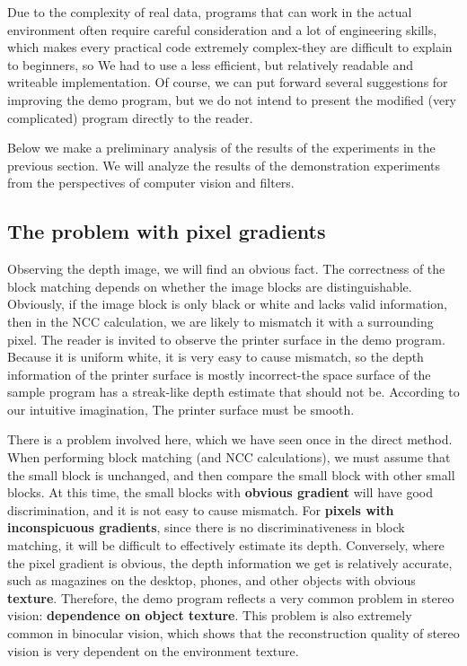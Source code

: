 Due to the complexity of real data, programs that can work in the actual environment often require careful consideration and a lot of engineering skills, which makes every practical code extremely complex-they are difficult to explain to beginners, so We had to use a less efficient, but relatively readable and writeable implementation. Of course, we can put forward several suggestions for improving the demo program, but we do not intend to present the modified (very complicated) program directly to the reader.

Below we make a preliminary analysis of the results of the experiments in the previous section. We will analyze the results of the demonstration experiments from the perspectives of computer vision and filters.

\subsection{The problem with pixel gradients}
Observing the depth image, we will find an obvious fact. The correctness of the block matching depends on whether the image blocks are distinguishable. Obviously, if the image block is only black or white and lacks valid information, then in the NCC calculation, we are likely to mismatch it with a surrounding pixel. The reader is invited to observe the printer surface in the demo program. Because it is uniform white, it is very easy to cause mismatch, so the depth information of the printer surface is mostly incorrect-the space surface of the sample program has a streak-like depth estimate that should not be. According to our intuitive imagination, The printer surface must be smooth.

There is a problem involved here, which we have seen once in the direct method. When performing block matching (and NCC calculations), we must assume that the small block is unchanged, and then compare the small block with other small blocks. At this time, the small blocks with \textbf{obvious gradient} will have good discrimination, and it is not easy to cause mismatch. For \textbf{pixels with inconspicuous gradients}, since there is no discriminativeness in block matching, it will be difficult to effectively estimate its depth. Conversely, where the pixel gradient is obvious, the depth information we get is relatively accurate, such as magazines on the desktop, phones, and other objects with obvious \textbf{texture}. Therefore, the demo program reflects a very common problem in stereo vision: \textbf{dependence on object texture}. This problem is also extremely common in binocular vision, which shows that the reconstruction quality of stereo vision is very dependent on the environment texture.

